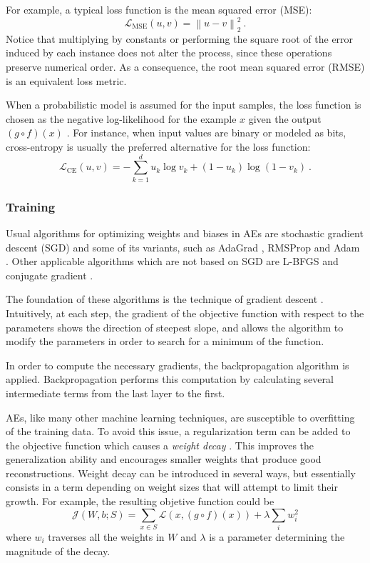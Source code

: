 \documentclass[preprint,5p,compress]{elsarticle}
\begin{document}
For example, a typical loss function is the mean squared error (MSE):
\begin{equation}
\mathcal L_{\mathrm{MSE}}(u, v)=\left\lVert u - v\right\rVert_2^2~.
\end{equation}
Notice that multiplying by constants or performing the square root of the error induced by each instance does not alter the process, since these operations preserve numerical order. As a consequence, the root mean squared error (RMSE) is an equivalent loss metric.

When a probabilistic model is assumed for the input samples, the loss function is chosen as the negative log-likelihood for the example $x$ given the output $(g\circ f)(x)$ \cite{LayerwiseTraining}. For instance, when input values are binary or modeled as bits, cross-entropy is usually the preferred alternative for the loss function:
\begin{equation}
  \mathcal L_{\mathrm{CE}}(u, v)=-\sum_{k=1}^d u_k \log v_k + (1 - u_k)\log(1 - v_k)~.
\end{equation}

\subsubsection{Training}\label{Sec.Training}

Usual algorithms for optimizing weights and biases in AEs are stochastic gradient descent (SGD) \cite{robbins1951stochastic} and some of its variants, such as AdaGrad \cite{duchi2011adaptive}, RMSProp \cite{tieleman2012lecture} and Adam \cite{kingma2015adam}. Other applicable algorithms which are not based on SGD are L-BFGS and conjugate gradient \cite{ngiam2011optimization}.

The foundation of these algorithms is the technique of gradient descent \cite{cauchy1847methode}. Intuitively, at each step, the gradient of the objective function with respect to the parameters shows the direction of steepest slope, and allows the algorithm to modify the parameters in order to search for a minimum of the function. 

In order to compute the necessary gradients, the backpropagation algorithm \cite{Backpropagation} is applied. Backpropagation performs this computation by calculating several intermediate terms from the last layer to the first.

AEs, like many other machine learning techniques, are susceptible to overfitting of the training data. To avoid this issue, a regularization term can be added to the objective function which causes a \textit{weight decay} \cite{krogh1992wd}. This improves the generalization ability and encourages smaller weights that produce good reconstructions. Weight decay can be introduced in several ways, but essentially consists in a term depending on weight sizes that will attempt to limit their growth. For example, the resulting objetive function could be
\begin{equation}
  \label{Eq.wd}
  \mathcal J(W,b;S)=\sum_{x\in S}\mathcal L(x, (g\circ f)(x)) + \lambda \sum_{i}w_i^2
\end{equation}
where $w_i$ traverses all the weights in $W$ and $\lambda$ is a parameter determining the magnitude of the decay.
\end{document}
